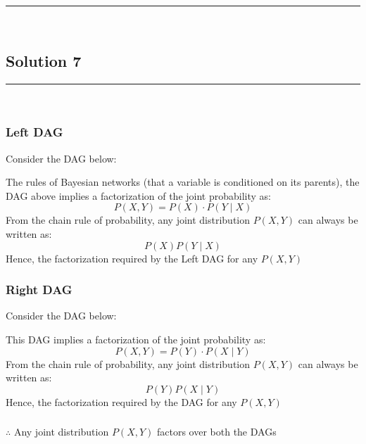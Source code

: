 \documentclass{article}
\begin{document}
\noindent\rule{\textwidth}{0.4pt}\\

\newpage

\subsection*{Solution 7}
\noindent\rule{\textwidth}{0.4pt}\\
\subsubsection*{Left DAG}
Consider the DAG below:
\begin{center}
\end{center}
The rules of Bayesian networks (that a variable is conditioned on its parents), the DAG above implies a factorization of the joint probability as:
    $$P(X,Y) = P(X) \cdot P(Y \mid X)$$
From the chain rule of probability, any joint distribution $P(X,Y)$ can always be written as:
$$P(X)P(Y \mid X)$$
Hence, the factorization required by the Left DAG  for any $P(X,Y)$
\subsubsection*{Right DAG}
Consider the DAG below:
\begin{center}
\end{center}
This DAG implies a factorization of the joint probability as:
$$P(X,Y) = P(Y) \cdot P(X \mid Y)$$
From the chain rule of probability, any joint distribution $P(X,Y)$ can always be written as:
$$P(Y)P(X \mid Y)$$
Hence, the factorization required by the DAG  for any $P(X,Y)$
\subsubsection*{\normalfont}{$\therefore$ Any joint distribution $P(X, Y)$ factors over both the DAGs}
\end{document}
